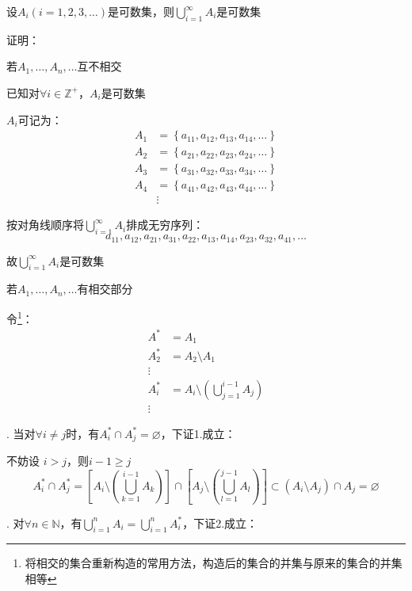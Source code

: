 \begin{td}
设$A_{i}\left(i =1,2,3,\dots\right) $是可数集，则$\bigcup \limits_{i=1}^{\infty}A_{i}$是可数集    
\end{td}
\noindent 证明：
\par {}若$A_{1},\dots,A_{n},\dots$互不相交
\par \quad 已知对$\forall i \in \mathbb{Z}^{+}$，$A_{i}$是可数集
\par \quad $A_{i}$可记为：
\begin{align*}
    A_{1} & =\left\{a_{11},a_{12},a_{13},a_{14},\dots\right\} \\
    A_{2} & =\left\{a_{21},a_{22},a_{23},a_{24},\dots\right\} \\
    A_{3} & =\left\{a_{31},a_{32},a_{33},a_{34},\dots\right\} \\
    A_{4} & =\left\{a_{41},a_{42},a_{43},a_{44},\dots\right\} \\
    & \vdots 
\end{align*}
\par \quad 按对角线顺序将$\bigcup \limits_{i=1}^{\infty}A_{i}$排成无穷序列：
$$a_{11},a_{12},a_{21},a_{31},a_{22},a_{13},a_{14},a_{23},a_{32},a_{41},\dots$$
\par \quad 故$\bigcup \limits_{i=1}^{\infty}A_{i}$是可数集
\par {}若$A_{1},\dots,A_{n},\dots$有相交部分
\par \quad 令\footnote{将相交的集合重新构造的常用方法，构造后的集合的并集与原来的集合的并集相等}：
\begin{align*}
    A^{*} & = A_{1} \\
    A^{*}_{2} & = A_{2} \setminus A_{1} \\
    \vdots \\
    A^{*}_{i} & = A_{i} \setminus \left(\bigcup \limits_{j=1}^{i-1}A_{j}\right) \\
    \vdots 
\end{align*}
\par \quad {}. 当对$\forall i \neq j$时，有$A^{*}_{i} \cap A^{*}_{j} = \varnothing $，下证\romannumeral1.成立：
\par \quad \quad 不妨设 $i > j$，则$i-1 \geqslant j$
$$A^{*}_{i} \cap A^{*}_{j} = \left[A_{i} \setminus \left(\bigcup \limits_{k=1}^{i-1}A_{k}\right)\right] \cap \left[A_{j} \setminus \left(\bigcup \limits_{l=1}^{j-1}A_{l}\right)\right] \subset \left(A_{i} \setminus A_{j}\right) \cap A_{j} = \varnothing$$
\par \quad {}. 对$\forall n \in \mathbb{N}$，有$\bigcup \limits_{i=1}^{n}A_{i} = \bigcup \limits_{i=1}^{n}A_{i}^{*}$，下证\romannumeral2.成立：
